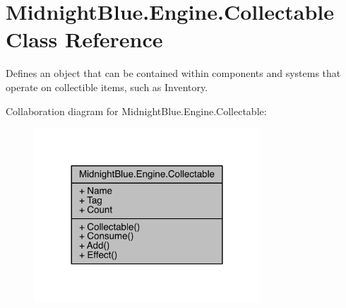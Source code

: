 \hypertarget{class_midnight_blue_1_1_engine_1_1_collectable}{}\section{Midnight\+Blue.\+Engine.\+Collectable Class Reference}
\label{class_midnight_blue_1_1_engine_1_1_collectable}


Defines an object that can be contained within components and systems that operate on collectible items, such as Inventory.  




Collaboration diagram for Midnight\+Blue.\+Engine.\+Collectable\+:
\nopagebreak
\begin{figure}[H]
\begin{center}
\leavevmode
\includegraphics[width=240pt]{class_midnight_blue_1_1_engine_1_1_collectable__coll__graph}
\end{center}
\end{figure}
